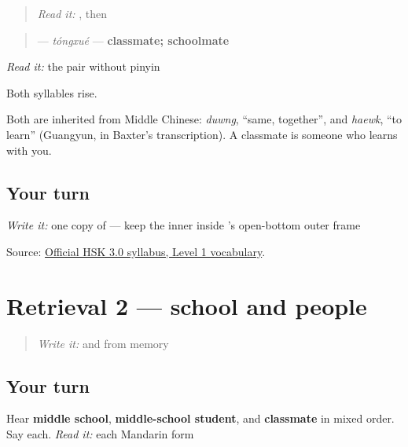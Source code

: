 \label{lesson:ZH-C15-tongxue}



\begin{quote}
\emph{Read it:} , then 
\end{quote}

\begin{cousinweb}
\begin{quote}
\textbf{} — \emph{tóngxué} — \textbf{classmate; schoolmate}
\end{quote}

\emph{Read it:} the pair without pinyin

Both syllables rise.

Both are inherited from Middle Chinese: \emph{duwng}, \textquotedblleft{}same, together\textquotedblright{}, and \emph{haewk}, \textquotedblleft{}to learn\textquotedblright{} (Guangyun, in Baxter's transcription). A classmate is someone who learns with you.
\end{cousinweb}

\subsection*{Your turn}
\emph{Write it:} one copy of \textbf{} — keep the inner  inside 's open-bottom outer frame

\begin{tcolorbox}[breakable,colback=teal!4,colframe=teal!35!black,title={Before you move on}]
Source: \href{https://hsk.cn-bj.ufileos.com/3.0/\%E6\%96\%B0\%E7\%89\%88HSK\%E8\%80\%83\%E8\%AF\%95\%E5\%A4\%A7\%E7\%BA\%B21219.pdf}{Official HSK 3.0 syllabus, Level 1 vocabulary}.
\end{tcolorbox}
\section[Practice]{Retrieval 2 — school and people}

\label{lesson:ZH-R15-school-map-2}



\begin{quote}
\emph{Write it:}  and  from memory
\end{quote}

\subsection*{Your turn}
Hear \textbf{middle school}, \textbf{middle-school student}, and \textbf{classmate} in mixed order. Say each. \emph{Read it:} each Mandarin form


